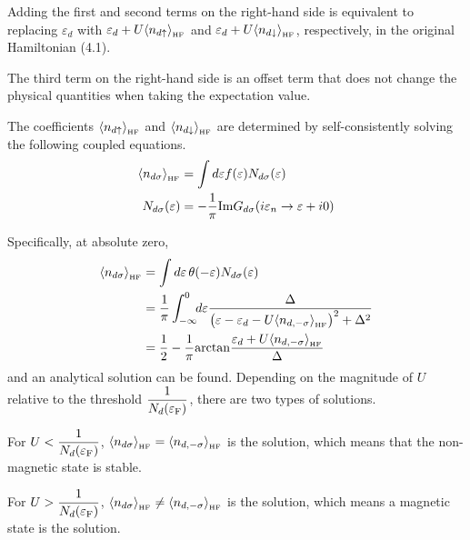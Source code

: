 \documentclass[a4j]{jarticle}
\begin{document}
Adding the first and second terms on the right-hand side is equivalent to replacing $\varepsilon_{d}$ with $\varepsilon_{d} + U \langle n_{d \uparrow} \rangle_{{}_{\rm HF}}$ and $\varepsilon_{d} + U \langle n_{d \downarrow} \rangle_{{}_{\rm HF}}$, respectively, in the original Hamiltonian (4.1).

The third term on the right-hand side is an offset term that does not change the physical quantities when taking the expectation value.

The coefficients $\langle n_{d \uparrow} \rangle_{{}_{\rm HF}}$ and $\langle n_{d \downarrow} \rangle_{{}_{\rm HF}}$ are determined by self-consistently solving the following coupled equations.
\begin{align}
	\langle n_{d \sigma} \rangle_{{}_{\rm HF}}
	 & =
	\int d \varepsilon
	f(\varepsilon) N_{d \sigma}(\varepsilon)
	\label{eqn:motonon}
	\\
	N_{d \sigma}(\varepsilon)
	 & =
	-
	\frac{1}{\pi}
	{\rm Im}G_{d \sigma}(i \varepsilon_{n} \to \varepsilon + i0)
\end{align}

Specifically, at absolute zero,
\begin{align}
	\langle n_{d \sigma} \rangle_{{}_{\rm HF}}
	 & =
	\int d \varepsilon
	\ \!
	\theta(- \varepsilon) N_{d \sigma}(\varepsilon)
	\nonumber \\ &=
	\frac{1}{\pi}
	\int^{0}_{-\infty}
	\!\!
	d \varepsilon
	\frac{
		\Delta
	}{
		\big(
		\varepsilon
		-
		\varepsilon_{d}
		-
		U
		\langle n_{d, -\sigma} \rangle_{{}_{\rm HF}}
		\big)^{2}
		+
		\Delta^{2}
	}
	\nonumber \\ &=
	\frac{1}{2}
	-
	\frac{1}{\pi}
	{\rm arctan}
	\frac{
		\varepsilon_{d}
		+
		U
		\langle n_{d, -\sigma} \rangle_{{}_{\rm HF}}
	}{
		\Delta
	}
	\label{eqn:hfnumber}
\end{align}
and an analytical solution can be found.
Depending on the magnitude of $U$ relative to the threshold $\dfrac{1}{N_{d}(\varepsilon_{\rm F})}$, there are two types of solutions.

For $U < \dfrac{1}{N_{d}(\varepsilon_{\rm F})}$,
$
	\langle n_{d \sigma} \rangle_{{}_{\rm HF}}
	=
	\langle n_{d, -\sigma} \rangle_{{}_{\rm HF}}
$
is the solution, which means that the non-magnetic state is stable.

For $U > \dfrac{1}{N_{d}(\varepsilon_{\rm F})}$,
$
	\langle n_{d \sigma} \rangle_{{}_{\rm HF}}
	\neq
	\langle n_{d, -\sigma} \rangle_{{}_{\rm HF}}
$
is the solution, which means a magnetic state is the solution.
\end{document}
